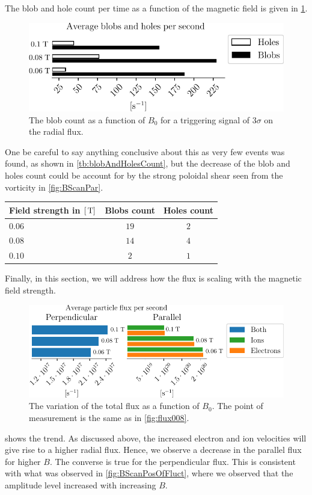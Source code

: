 The blob and hole count per time as a function of the magnetic field is given in \cref{fig:BScanBlobCount}.
%
\begin{figure}[htb]
    \centering
    \includegraphics{fig/results/bScan/BScanBlobCount}
    \caption{The blob count as a function of $B_0$ for a triggering signal of $3\sigma$ on the radial flux.}
    \label{fig:BScanBlobCount}
\end{figure}
%
One be careful to say anything conclusive about this as very few events was found, as shown in \cref{tb:blobAndHolesCount}, but the decrease of the blob and holes count could be account for by the strong poloidal shear seen from the vorticity in \cref{fig:BScanPar}.
%
\begin{center}
        \begin{tabular}{l|cc}
            \hline
            Field strength in $[\, \text{T}]$ & Blobs count & Holes count\\
            \hline
            $0.06$ & $19$ & $2$ \\
            $0.08$ & $14$ & $4$ \\
            $0.10$ & $ 2$ & $1$ \\
            \hline\hline
        \end{tabular}
        \label{tb:blobAndHolesCount}
\end{center}
%

Finally, in this section, we will address how the flux is scaling with the magnetic field strength.
%
\begin{figure}[htb]
    \centering
    \includegraphics{fig/results/bScan/BScanTotalFlux}
    \caption{
        The variation of the total flux as a function of $B_0$.
        The point of measurement is the same as in \cref{fig:flux008}.
    }
    \label{fig:BScanTotalFlux}
\end{figure}
%
 shows the trend.
As discussed above, the increased electron and ion velocities will give rise to a higher radial flux.
Hence, we observe a decrease in the parallel flux for higher $B$.
The converse is true for the perpendicular flux.
This is consistent with what was observed in \cref{fig:BScanPosOfFluct}, where we observed that the amplitude level increased with increasing $B$.
